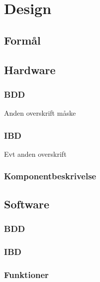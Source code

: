 \chapter{Design}

\section{Formål}

\section{Hardware}

\subsection{BDD}
Anden overskrift måske
\subsection{IBD}
Evt anden overskrift
\subsection{Komponentbeskrivelse}
\section{Software}

\subsection{BDD}
\subsection{IBD}
\subsection{Funktioner}